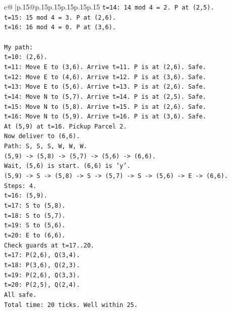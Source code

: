 \documentclass{article}
\begin{document}
{\begin{supertabular}{c@{$\;$}|p{.15\linewidth}@{}p{.15\linewidth}p{.15\linewidth}p{.15\linewidth}p{.15\linewidth}p{.15\linewidth}}
{{{\texttt{t=14: 14 mod 4 = 2. P at (2,5).} \\
\texttt{t=15: 15 mod 4 = 3. P at (2,6).} \\
\texttt{t=16: 16 mod 4 = 0. P at (3,6).} \\
\\ 
\texttt{My path:} \\
\texttt{t=10: (2,6).} \\
\texttt{t=11: Move E to (3,6). Arrive t=11. P is at (2,6). Safe.} \\
\texttt{t=12: Move E to (4,6). Arrive t=12. P is at (3,6). Safe.} \\
\texttt{t=13: Move E to (5,6). Arrive t=13. P is at (2,6). Safe.} \\
\texttt{t=14: Move N to (5,7). Arrive t=14. P is at (2,5). Safe.} \\
\texttt{t=15: Move N to (5,8). Arrive t=15. P is at (2,6). Safe.} \\
\texttt{t=16: Move N to (5,9). Arrive t=16. P is at (3,6). Safe.} \\
\texttt{At (5,9) at t=16. Pickup Parcel 2.} \\
\texttt{Now deliver to (6,6).} \\
\texttt{Path: S, S, S, W, W, W.} \\
\texttt{(5,9) {-}> (5,8) {-}> (5,7) {-}> (5,6) {-}> (6,6).} \\
\texttt{Wait, (5,6) is start. (6,6) is 'y'.} \\
\texttt{(5,9) {-}> S {-}> (5,8) {-}> S {-}> (5,7) {-}> S {-}> (5,6) {-}> E {-}> (6,6).} \\
\texttt{Steps: 4.} \\
\texttt{t=16: (5,9).} \\
\texttt{t=17: S to (5,8).} \\
\texttt{t=18: S to (5,7).} \\
\texttt{t=19: S to (5,6).} \\
\texttt{t=20: E to (6,6).} \\
\texttt{Check guards at t=17..20.} \\
\texttt{t=17: P(2,6), Q(3,4).} \\
\texttt{t=18: P(3,6), Q(2,3).} \\
\texttt{t=19: P(2,6), Q(3,3).} \\
\texttt{t=20: P(2,5), Q(2,4).} \\
\texttt{All safe.} \\
\texttt{Total time: 20 ticks. Well within 25.} \\
\\ 
}}}
\end{supertabular}}
\end{document}
